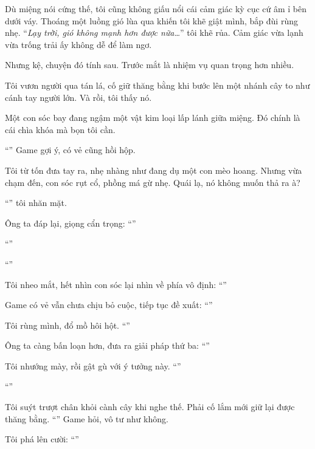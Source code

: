 \documentclass[../main.tex]{subfiles}
\begin{document}
Dù miệng nói cứng thế, tôi cũng không giấu nổi cái cảm giác kỳ cục cứ âm ỉ bên dưới váy. Thoáng một luồng gió lùa qua khiến tôi khẽ giật mình, bắp đùi rùng nhẹ. ``\textit{Lạy trời, gió không mạnh hơn được nữa\dots}'' tôi khẽ rủa. Cảm giác vừa lạnh vừa trống trải ấy không dễ để làm ngơ.

Nhưng kệ, chuyện đó tính sau. Trước mắt là nhiệm vụ quan trọng hơn nhiều.

Tôi vươn người qua tán lá, cố giữ thăng bằng khi bước lên một nhánh cây to như cánh tay người lớn. Và rồi, tôi thấy nó.

Một con sóc bay đang ngậm một vật kim loại lấp lánh giữa miệng. Đó chính là cái chìa khóa mà bọn tôi cần.


``'' Game gợi ý, có vẻ cũng hồi hộp.

Tôi từ tốn đưa tay ra, nhẹ nhàng như đang dụ một con mèo hoang. Nhưng vừa chạm đến, con sóc rụt cổ, phồng má gừ nhẹ. Quái lạ, nó không muốn thả ra à?

``'' tôi nhăn mặt.

Ông ta đáp lại, giọng cẩn trọng: ``''

``''

``''

Tôi nheo mắt, hết nhìn con sóc lại nhìn về phía vô định: ``''

Game có vẻ vẫn chưa chịu bỏ cuộc, tiếp tục đề xuất: ``''

Tôi rùng mình, đổ mồ hôi hột. ``''

Ông ta càng bấn loạn hơn, đưa ra giải pháp thứ ba: ``''

Tôi nhướng mày, rồi gật gù với ý tưởng này. ``''

``''

Tôi suýt trượt chân khỏi cành cây khi nghe thế. Phải cố lắm mới giữ lại được thăng bằng. ``'' Game hỏi, vô tư như không.

Tôi phá lên cười: ``''
\end{document}
